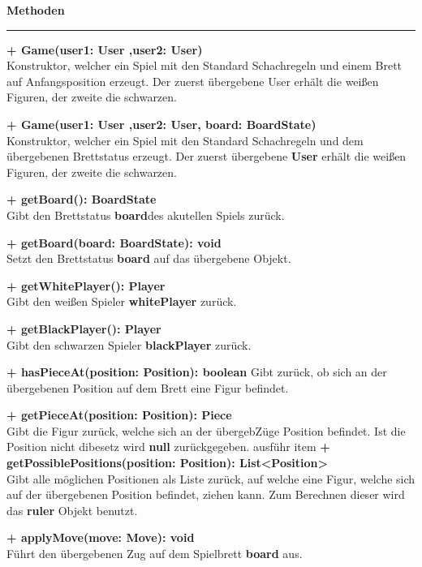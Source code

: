 \documentclass[parskip=full]{scrartcl}
\begin{document}
				 \textbf{\large{Methoden}}
				 \newline
		 		\rule{\textwidth}{1pt}
	 			\begin{description}
					 \item \textbf{+ Game(user1: User ,user2: User)}\\ Konstruktor, welcher ein Spiel mit den Standard Schachregeln und einem Brett auf Anfangsposition erzeugt. Der zuerst übergebene User erhält die weißen Figuren, der zweite die schwarzen.
					 \item \textbf{+ Game(user1: User ,user2: User, board: BoardState)}\\ Konstruktor, welcher ein Spiel mit den Standard Schachregeln und dem übergebenen Brettstatus erzeugt. Der zuerst übergebene \textbf{User} erhält die weißen Figuren, der zweite die schwarzen.
					 \item \textbf{+ getBoard(): BoardState}\\ Gibt den Brettstatus \textbf{board}des akutellen Spiels zurück.
					\item \textbf{+ getBoard(board: BoardState): void}\\ Setzt den Brettstatus \textbf{board} auf das übergebene Objekt.
					\item \textbf{+ getWhitePlayer(): Player}\\ Gibt den weißen Spieler \textbf{whitePlayer} zurück.
					\item \textbf{+ getBlackPlayer(): Player}\\ Gibt den schwarzen Spieler \textbf{blackPlayer} zurück.
					\item \textbf{+ hasPieceAt(position: Position): boolean} Gibt zurück, ob sich an der übergebenen Position auf dem Brett eine Figur befindet.
					\item \textbf{+ getPieceAt(position: Position): Piece}\\ Gibt die Figur zurück, welche sich an der übergebZüge Position befindet. Ist die Position nicht dibesetz wird \textbf{null} zurückgegeben.        ausführ     item \textbf{+ getPossiblePositions(position: Position): List<Position>}\\ Gibt alle möglichen Positionen als Liste zurück, auf welche eine Figur, welche sich auf der übergebenen Position befindet, ziehen kann. Zum Berechnen dieser wird das \textbf{ruler} Objekt benutzt.
					\item \textbf{+ applyMove(move: Move): void}\\ Führt den übergebenen Zug auf dem Spielbrett \textbf{board} aus.

\end{description}
\end{document}
